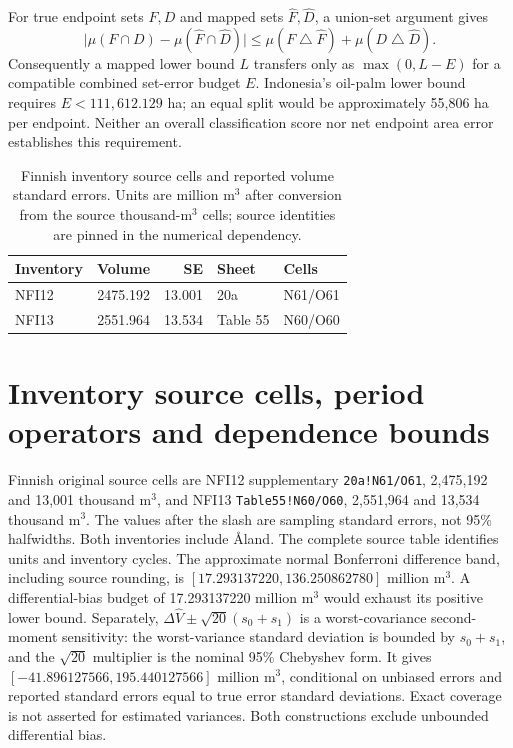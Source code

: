For true endpoint sets $F,D$ and mapped sets $\widehat F,\widehat D$, a union-set argument gives
\[
\bigl|\mu(F\cap D)-\mu(\widehat F\cap\widehat D)\bigr|
\le\mu(F\mathbin{\triangle}\widehat F)+\mu(D\mathbin{\triangle}\widehat D).
\]
Consequently a mapped lower bound $L$ transfers only as $\max(0,L-E)$ for a compatible combined set-error budget $E$. Indonesia's oil-palm lower bound requires $E<111,612.129$ ha; an equal split would be approximately 55,806 ha per endpoint. Neither an overall classification score nor net endpoint area error establishes this requirement.

\begin{table}[htbp]
\centering\small
\caption{Finnish inventory source cells and reported volume standard errors. Units are million m$^3$ after conversion from the source thousand-m$^3$ cells; source identities are pinned in the numerical dependency.}\label{tab:SI_inventory_cells}
\begin{tabularx}{\textwidth}{lrrll}\toprule
Inventory & Volume & SE & Sheet & Cells\\\midrule
NFI12 & 2475.192 & 13.001 & 20a & N61/O61\\
NFI13 & 2551.964 & 13.534 & Table 55 & N60/O60\\
\bottomrule\end{tabularx}
\end{table}

\section{Inventory source cells, period operators and dependence bounds}
Finnish original source cells are NFI12 supplementary \texttt{20a!N61/O61}, 2,475,192 and 13,001 thousand m$^3$, and NFI13 \texttt{Table55!N60/O60}, 2,551,964 and 13,534 thousand m$^3$. The values after the slash are sampling standard errors, not 95\% halfwidths. Both inventories include \AA land. The complete source table identifies units and inventory cycles. The approximate normal Bonferroni difference band, including source rounding, is $[17.293137220,136.250862780]$ million m$^3$. A differential-bias budget of 17.293137220 million m$^3$ would exhaust its positive lower bound. Separately, $\Delta\widehat V\pm\sqrt{20}(s_0+s_1)$ is a worst-covariance second-moment sensitivity: the worst-variance standard deviation is bounded by $s_0+s_1$, and the $\sqrt{20}$ multiplier is the nominal 95\% Chebyshev form. It gives $[-41.896127566,195.440127566]$ million m$^3$, conditional on unbiased errors and reported standard errors equal to true error standard deviations. Exact coverage is not asserted for estimated variances. Both constructions exclude unbounded differential bias.

